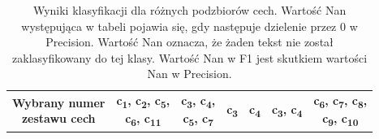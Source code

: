 \documentclass{classrep}
\begin{document}
\newpage


\begin{table}[h!]
\caption{Wyniki klasyfikacji dla różnych podzbiorów cech. Wartość Nan występująca w tabeli pojawia się, gdy następuje dzielenie przez 0 w Precision. Wartość Nan oznacza, że żaden tekst nie został zaklasyfikowany do tej klasy. Wartość Nan w F1 jest skutkiem wartości Nan w Precision.}
\centering
\vspace{0.1cm}
 \begin{tabular}{c c c c c c c}

    \makecell{\textbf{Wybrany numer} \\\textbf{zestawu cech}} & \makecell{\textbf{c\textsubscript{1},  c\textsubscript{2}, c\textsubscript{5},} \\\textbf{ c\textsubscript{6}, c\textsubscript{11}}} & \makecell{\textbf{c\textsubscript{3},  c\textsubscript{4},} \\ \textbf{c\textsubscript{5},  c\textsubscript{7}}}  & \textbf{ c\textsubscript{3}}  & \textbf{ c\textsubscript{4}}  & \textbf{ c\textsubscript{3},  c\textsubscript{4}} & 
\makecell{\textbf{c\textsubscript{6}, c\textsubscript{7}, c\textsubscript{8},} \\\textbf{ c\textsubscript{9}, c\textsubscript{10}}} \\


\end{tabular}
\end{table}
\end{document}
